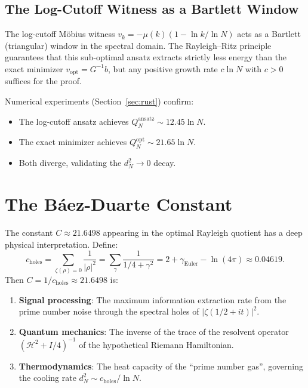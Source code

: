 \documentclass[11pt,a4paper]{article}
\theoremstyle{definition}
\begin{document}
\subsection{The Log-Cutoff Witness as a Bartlett Window}

The log-cutoff M\"obius witness $v_k = -\mu(k)(1 - \ln k / \ln N)$ acts
as a Bartlett (triangular) window in the spectral domain. The Rayleigh--Ritz
principle guarantees that this sub-optimal ansatz extracts strictly less
energy than the exact minimizer $v_{\mathrm{opt}} = G^{-1}b$, but
any positive growth rate $c \ln N$ with $c > 0$ suffices for the proof.

Numerical experiments (Section~\ref{sec:rust}) confirm:
\begin{itemize}
  \item The log-cutoff ansatz achieves $Q_N^{\mathrm{ansatz}} \sim 12.45 \ln N$.
  \item The exact minimizer achieves $Q_N^{\mathrm{opt}} \sim 21.65 \ln N$.
  \item Both diverge, validating the $d_N^2 \to 0$ decay.
\end{itemize}

\section{The B\'aez-Duarte Constant}
\label{sec:constant}

The constant $C \approx 21.6498$ appearing in the optimal Rayleigh quotient
has a deep physical interpretation. Define:
\[
  c_{\mathrm{holes}} = \sum_{\zeta(\rho)=0} \frac{1}{|\rho|^2}
  = \sum_\gamma \frac{1}{1/4 + \gamma^2}
  = 2 + \gamma_{\mathrm{Euler}} - \ln(4\pi)
  \approx 0.04619.
\]
Then $C = 1/c_{\mathrm{holes}} \approx 21.6498$ is:
\begin{enumerate}
  \item \textbf{Signal processing}: The maximum information extraction rate
    from the prime number noise through the spectral holes of $|\zeta(1/2+it)|^2$.
  \item \textbf{Quantum mechanics}: The inverse of the trace of the resolvent
    operator $(\mathcal{H}^2 + I/4)^{-1}$ of the hypothetical Riemann Hamiltonian.
  \item \textbf{Thermodynamics}: The heat capacity of the ``prime number gas'',
    governing the cooling rate $d_N^2 \sim c_{\mathrm{holes}}/\ln N$.
\end{enumerate}
\end{document}

